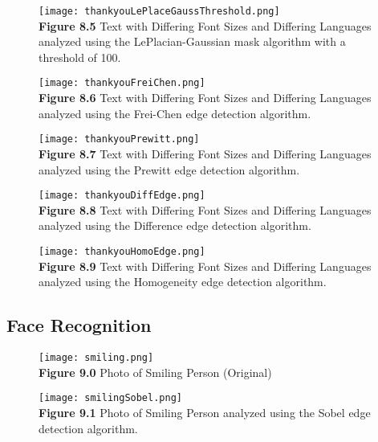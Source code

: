 \documentclass{article}%
\begin{document}
\newpage
\begin{figure}[h]
\centering
\texttt{[image: thankyouLePlaceGaussThreshold.png]}\\
{\bf Figure 8.5} Text with Differing Font Sizes and Differing Languages analyzed using the LePlacian-Gaussian mask algorithm with a threshold of 100.  
\end{figure}

\newpage
\begin{figure}[h]
\centering
\texttt{[image: thankyouFreiChen.png]}\\
{\bf Figure 8.6} Text with Differing Font Sizes and Differing Languages analyzed using the Frei-Chen edge detection algorithm.  
\end{figure}

\newpage
\begin{figure}[h]
\centering
\texttt{[image: thankyouPrewitt.png]}\\
{\bf Figure 8.7} Text with Differing Font Sizes and Differing Languages analyzed using the Prewitt edge detection algorithm.  
\end{figure}

\newpage
\begin{figure}[h]
\centering
\texttt{[image: thankyouDiffEdge.png]}\\
{\bf Figure 8.8} Text with Differing Font Sizes and Differing Languages analyzed using the Difference edge detection algorithm.  
\end{figure}

\newpage
\begin{figure}[h]
\centering
\texttt{[image: thankyouHomoEdge.png]}\\
{\bf Figure 8.9} Text with Differing Font Sizes and Differing Languages analyzed using the Homogeneity edge detection algorithm.  
\end{figure}

\clearpage


\subsection{Face Recognition}
\begin{figure}[h]
\centering
\texttt{[image: smiling.png]}\\
{\bf Figure 9.0} Photo of Smiling Person (Original)
\end{figure}

\newpage
\begin{figure}[h]
\centering
\texttt{[image: smilingSobel.png]}\\
{\bf Figure 9.1} Photo of Smiling Person analyzed using the Sobel edge detection algorithm.   
\end{figure}
\end{document}

